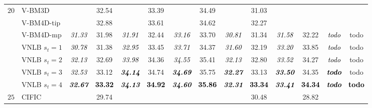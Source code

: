 \documentclass[10pt, journal, twocolumn, final, a4paper]{IEEEtran}
\newcommand{\best}[1]{#1}
\newcommand{\bsic}[1]{\textcolor{black}{\textit{#1}}}
\newcommand{\Bsic}[1]{\textcolor{black}{\textbf{\textit{#1}}}}
\newcommand{\Best}[1]{\textbf{\textcolor{black}{#1}}}
\begin{document}
\begin{table}[htp!]
\begin{center}
{\begin{tabular}{ c | l |c c | c c | c c | c c | c c | c c}
			\multirow{1}{*}{$20$}
			                      & V-BM3D               & \bsic{     } &       32.54  & \bsic{     } &       33.39  & \bsic{     } &       34.49  & \bsic{     } &       31.03  & \bsic{     } &              & \bsic{     } &              \\
			                      & V-BM4D-tip           & \bsic{     } & \best{32.88} & \bsic{     } & \best{33.61} & \bsic{     } & \best{34.62} & \bsic{     } & \best{32.27} & \bsic{     } & \best{     } & \bsic{     } & \best{     } \\
			                      & V-BM4D-mp            & \bsic{31.33} &       31.98  & \bsic{31.91} &       32.44  & \bsic{33.16} &       33.70  & \bsic{30.81} &       31.34  & \bsic{31.58} &       32.22  & \bsic{todo } &       todo   \\
			                      & VNLB   $s_t = 1$     & \bsic{30.78} &       31.38  & \bsic{32.95} &       33.45  & \bsic{33.71} &       34.37  & \bsic{31.60} &       32.19  & \bsic{33.20} &       33.85  & \bsic{todo } &       todo   \\
			                      & VNLB   $s_t = 2$     & \bsic{32.13} &       32.69  & \bsic{33.98} &       34.36  & \bsic{34.55} &       35.41  & \bsic{32.13} &       32.80  & \bsic{33.52} &       34.27  & \bsic{todo } &       todo   \\
			                      & VNLB   $s_t = 3$     & \bsic{32.53} &       33.12  & \Bsic{34.14} &       34.74  & \Bsic{34.69} &       35.75  & \Bsic{32.27} &       33.13  & \Bsic{33.50} &       34.35  & \Bsic{todo } &       todo   \\
			                      & VNLB   $s_t = 4$     & \Bsic{32.67} & \Best{33.32} & \Bsic{34.13} & \Best{34.92} & \Bsic{34.60} & \Best{35.86} & \Bsic{32.31} & \Best{33.34} & \Bsic{33.41} & \Best{34.34} & \Bsic{todo } & \Best{todo } \\\hline
%                                                                                                                                                                                                                                         
			\multirow{1}{*}{$25$}
			                      & CIFIC                & \bsic{     } &       29.74  & \bsic{     } &              & \bsic{     } &              & \bsic{     } &       30.48  & \bsic{     } &       28.82  & \bsic{     } &              \\

\end{tabular}}
\end{center}
\end{table}
\end{document}

